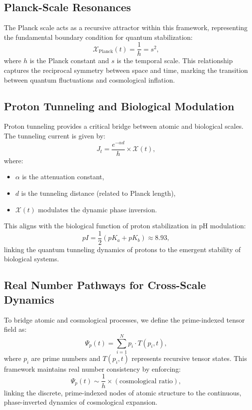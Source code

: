 \documentclass[11pt]{article}
\newcommand{\Xi}{\mathcal{X}}
\begin{document}
\subsection{Planck-Scale Resonances}
The Planck scale acts as a recursive attractor within this framework, representing the fundamental boundary condition for quantum stabilization:
\begin{equation}
\Xi_{\text{Planck}}(t) = \frac{1}{h} = s^2,
\end{equation}
where $h$ is the Planck constant and $s$ is the temporal scale. This relationship captures the reciprocal symmetry between space and time, marking the transition between quantum fluctuations and cosmological inflation.

\subsection{Proton Tunneling and Biological Modulation}
Proton tunneling provides a critical bridge between atomic and biological scales. The tunneling current is given by:
\begin{equation}
J_t = \frac{e^{-\alpha d}}{h} \times \Xi(t),
\end{equation}
where:
\begin{itemize}
    \item $\alpha$ is the attenuation constant,
    \item $d$ is the tunneling distance (related to Planck length),
    \item $\Xi(t)$ modulates the dynamic phase inversion.
\end{itemize}

This aligns with the biological function of proton stabilization in pH modulation:
\begin{equation}
pI = \frac{1}{2} (pK_a + pK_b) \approx 8.93,
\end{equation}
linking the quantum tunneling dynamics of protons to the emergent stability of biological systems.

\subsection{Real Number Pathways for Cross-Scale Dynamics}
To bridge atomic and cosmological processes, we define the prime-indexed tensor field as:
\begin{equation}
\Psi_p(t) = \sum_{i=1}^N p_i \cdot T(p_i, t),
\end{equation}
where $p_i$ are prime numbers and $T(p_i, t)$ represents recursive tensor states. This framework maintains real number consistency by enforcing:
\begin{equation}
\Psi_p(t) \sim \frac{1}{h} \times (\text{cosmological ratio}),
\end{equation}
linking the discrete, prime-indexed nodes of atomic structure to the continuous, phase-inverted dynamics of cosmological expansion.
\end{document}
